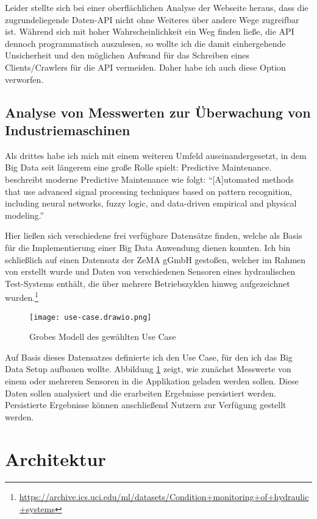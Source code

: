 Leider stellte sich bei einer oberflächlichen Analyse der Webseite heraus, dass die zugrundeliegende Daten-API nicht ohne Weiteres über andere Wege zugreifbar ist.
Während sich mit hoher Wahrscheinlichkeit ein Weg finden ließe, die API dennoch programmatisch auszulesen, so wollte ich die damit einhergehende Unsicherheit und den möglichen Aufwand für das Schreiben eines Clients/Crawlers für die API vermeiden.
Daher habe ich auch diese Option verworfen.

\subsection{Analyse von Messwerten zur Überwachung von Industriemaschinen}

Als drittes habe ich mich mit einem weiteren Umfeld auseinandergesetzt, in dem Big Data seit längerem eine große Rolle spielt: Predictive Maintenance.
\citeauthor{hashemian_state---art_2011} beschreibt moderne Predictive Maintenance wie folgt: \enquote{[A]utomated methods that use advanced signal processing techniques based on pattern recognition, including neural networks, fuzzy logic, and data-driven empirical and physical modeling.} \parencite{hashemian_state---art_2011}

Hier ließen sich verschiedene frei verfügbare Datensätze finden, welche als Basis für die Implementierung einer Big Data Anwendung dienen konnten.
Ich bin schließlich auf einen Datensatz der ZeMA gGmbH gestoßen, welcher im Rahmen von \cite{helwig_condition_2015} erstellt wurde und Daten von verschiedenen Sensoren eines hydraulischen Test-Systems enthält, die über mehrere Betriebszyklen hinweg aufgezeichnet wurden.\footnote{\url{https://archive.ics.uci.edu/ml/datasets/Condition+monitoring+of+hydraulic+systems}}

\begin{figure}[H]
  \centering
  \texttt{[image: use-case.drawio.png]}
  \caption{Grobes Modell des gewählten Use Case}\label{fig:use-case}
\end{figure}

Auf Basis dieses Datensatzes definierte ich den Use Case, für den ich das Big Data Setup aufbauen wollte.
Abbildung \ref{fig:use-case} zeigt, wie zunächst Messwerte von einem oder mehreren Sensoren in die Applikation geladen werden sollen.
Diese Daten sollen analysiert und die erarbeiten Ergebnisse persistiert werden.
Persistierte Ergebnisse können anschließend Nutzern zur Verfügung gestellt werden.

\section{Architektur}\label{sec:architektur}

